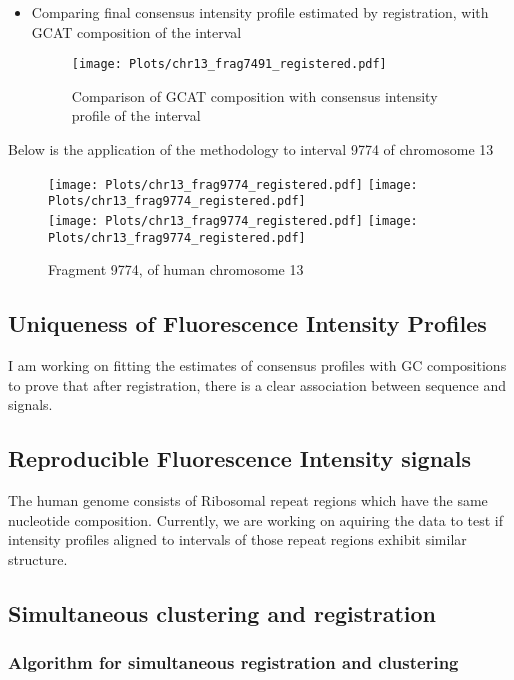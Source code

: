 \begin{itemize}
\item Comparing final consensus intensity profile estimated by registration, with GCAT composition of the interval
\begin{figure}[H]
\begin{center}
\texttt{[image: Plots/chr13\_frag7491\_registered.pdf]}
\end{center}
\caption{Comparison of GCAT composition with consensus intensity profile of the interval}
\label{fig:Frag7491_Compare}
\end{figure}
\end{itemize}

\newpage
Below is the application of the methodology to interval 9774 of chromosome 13
\begin{figure}[H]
\begin{center}
\texttt{[image: Plots/chr13\_frag9774\_registered.pdf]}
\texttt{[image: Plots/chr13\_frag9774\_registered.pdf]} \\
\texttt{[image: Plots/chr13\_frag9774\_registered.pdf]} 
\texttt{[image: Plots/chr13\_frag9774\_registered.pdf]}
\end{center}
\caption{Fragment 9774, of human chromosome 13}
\label{fig:Frag9774_All}
\end{figure}

\subsection{Uniqueness of Fluorescence Intensity Profiles}
\begin{tcolorbox}[colback=red!5,colframe=red!40!black,title=Work in progress] %
I am working on fitting the estimates of consensus profiles with GC compositions to prove that after registration, there is a clear association between sequence and signals. 
\end{tcolorbox}

\subsection{Reproducible Fluorescence Intensity signals}
\begin{tcolorbox}[colback=green!5,colframe=green!40!black,title=Work in progress] %
The human genome consists of Ribosomal repeat regions which have the same nucleotide composition. Currently, we are working on aquiring the data to test if intensity profiles aligned to intervals of those repeat regions exhibit similar structure.
\end{tcolorbox}


\subsection{Simultaneous clustering and registration}
\subsubsection{Algorithm for simultaneous registration and clustering}



